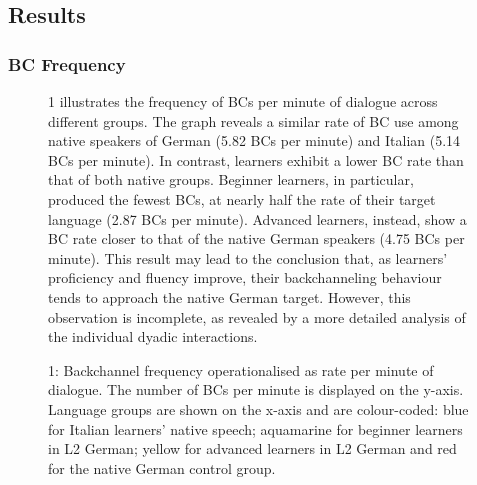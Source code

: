 \subsection{Results}
\hypertarget{Toc191305950}{}\subsubsection{BC Frequency}
\hypertarget{Toc191305951}{}\begin{figure}
\caption{1 illustrates the frequency of BCs per minute of dialogue across different groups. The graph reveals a similar rate of BC use among native speakers of German (5.82 BCs per minute) and Italian (5.14 BCs per minute). In contrast, learners exhibit a lower BC rate than that of both native groups. Beginner learners, in particular, produced the fewest BCs, at nearly half the rate of their target language (2.87 BCs per minute). Advanced learners, instead, show a BC rate closer to that of the native German speakers (4.75 BCs per minute). This result may lead to the conclusion that, as learners' proficiency and fluency improve, their backchanneling behaviour tends to approach the native German target. However, this observation is incomplete, as revealed by a more detailed analysis of the individual dyadic interactions.}
\label{fig:key:4}
\end{figure}

  
 

\begin{stylecaption}\begin{figure}
\caption{1: Backchannel frequency operationalised as rate per minute of dialogue. The number of BCs per minute is displayed on the y-axis. Language groups are shown on the x-axis and are colour-coded: blue for Italian learners’ native speech; aquamarine for beginner learners in L2 German; yellow for advanced learners in L2 German and red for the native German control group.}
\label{fig:key:4}
\end{figure}\end{stylecaption}

